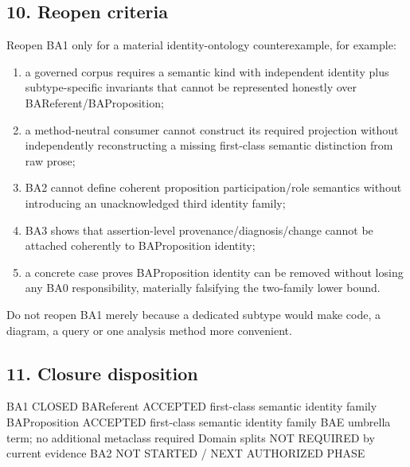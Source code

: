 \documentclass[
  10pt,
  a4paper,
]{article}
\newenvironment{Shaded}{}{}
\newcommand{\NormalTok}[1]{#1}
\providecommand{\tightlist}{%
  \setlength{\itemsep}{0pt}\setlength{\parskip}{0pt}}
\begin{document}
\subsection{10. Reopen criteria}\label{reopen-criteria}

Reopen BA1 only for a material identity-ontology counterexample, for
example:

\begin{enumerate}
\def\labelenumi{\arabic{enumi}.}
\tightlist
\item
  a governed corpus requires a semantic kind with independent identity
  plus subtype-specific invariants that cannot be represented honestly
  over BAReferent/BAProposition;
\item
  a method-neutral consumer cannot construct its required projection
  without independently reconstructing a missing first-class semantic
  distinction from raw prose;
\item
  BA2 cannot define coherent proposition participation/role semantics
  without introducing an unacknowledged third identity family;
\item
  BA3 shows that assertion-level provenance/diagnosis/change cannot be
  attached coherently to BAProposition identity;
\item
  a concrete case proves BAProposition identity can be removed without
  losing any BA0 responsibility, materially falsifying the two-family
  lower bound.
\end{enumerate}

Do not reopen BA1 merely because a dedicated subtype would make code, a
diagram, a query or one analysis method more convenient.

\subsection{11. Closure disposition}\label{closure-disposition}

\begin{Shaded}
\begin{Highlighting}[]
\NormalTok{BA1             CLOSED}
\NormalTok{BAReferent      ACCEPTED first{-}class semantic identity family}
\NormalTok{BAProposition   ACCEPTED first{-}class semantic identity family}
\NormalTok{BAE             umbrella term; no additional metaclass required}
\NormalTok{Domain splits   NOT REQUIRED by current evidence}
\NormalTok{BA2             NOT STARTED / NEXT AUTHORIZED PHASE}
\end{Highlighting}
\end{Shaded}
\end{document}
